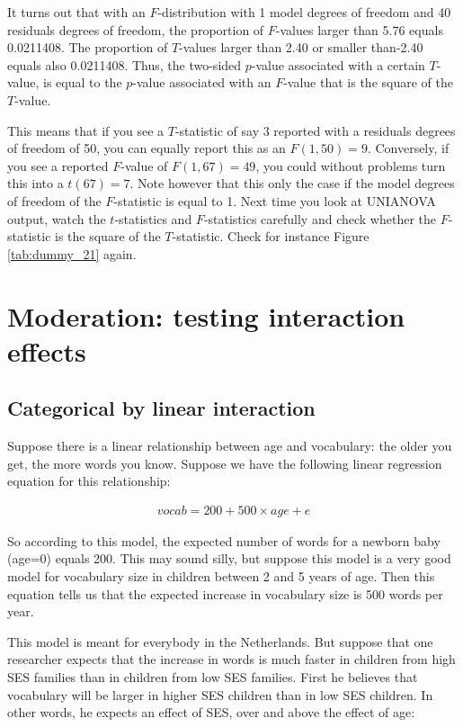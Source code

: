\documentclass[]{report}\usepackage[]{graphicx}\usepackage[]{color}
\begin{document}
It turns out that with an $F$-distribution with 1 model degrees of freedom and 40 residuals degrees of freedom, the proportion of $F$-values larger than 5.76 equals 0.0211408. The proportion of $T$-values larger than 2.40 or smaller than-2.40 equals also 0.0211408. Thus, the two-sided $p$-value associated with a certain $T$-value, is equal to the $p$-value associated with an $F$-value that is the square of the $T$-value. 

This means that if you see a $T$-statistic of say 3 reported with a residuals degrees of freedom of 50, you can equally report this as an $F(1,50)=9$. Conversely, if you see a reported $F$-value of $F(1,67)=49$, you could without problems turn this into a $t(67)=7$. Note however that this only the case if the model degrees of freedom of the $F$-statistic is equal to 1. Next time you look at UNIANOVA output, watch the $t$-statistics and $F$-statistics carefully and check whether the $F$-statistic is the square of the $T$-statistic. Check for instance Figure \ref{tab:dummy_21} again.   







\chapter{Moderation: testing interaction effects}





\section{Categorical by linear interaction}

Suppose there is a linear relationship between age and vocabulary: the older you get, the more words you know. Suppose we have the following linear regression equation for this relationship:


\begin{eqnarray}
vocab = 200 + 500 \times age + e
\end{eqnarray}

So according to this model, the expected number of words for a newborn baby (age=0) equals 200. This may sound silly, but suppose this model is a very good model for vocabulary size in children between 2 and 5 years of age. Then this equation tells us that the expected increase in vocabulary size is 500 words per year.

This model is meant for everybody in the Netherlands. But suppose that one researcher expects that the increase in words is much faster in children from high SES families than in children from low SES families. First he believes that vocabulary will be larger in higher SES children than in low SES children. In other words, he expects an effect of SES, over and above the effect of age:
\end{document}
